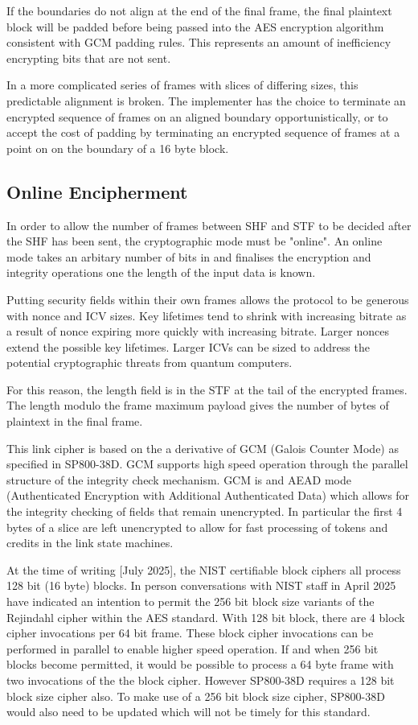 \documentclass[../../../OAE-SPEC-MAIN.tex]{subfiles}
\begin{document}
If the boundaries do not align at the end of the final frame, the final plaintext block will be padded before being passed into the AES encryption algorithm consistent with GCM padding rules. This represents an amount of inefficiency encrypting bits that are not sent.

In a more complicated series of frames with slices of differing sizes, this predictable alignment is broken. The implementer has the choice to terminate an encrypted sequence of frames on an aligned boundary opportunistically, or to accept the cost of padding by terminating an encrypted sequence of frames at a point on on the boundary of a 16 byte block.

\subsection{Online Encipherment}
\label{subsection:online_encipherment}
In order to allow the number of frames between SHF and STF to be decided after the SHF has been sent, the cryptographic mode must be "online". An online mode takes an arbitary number of bits in and finalises the encryption and integrity operations one the length of the input data is known.

Putting security fields within their own frames allows the protocol to be generous with nonce and ICV sizes. Key lifetimes tend to shrink with increasing bitrate as a result of nonce expiring more quickly with increasing bitrate. Larger nonces extend the possible key lifetimes. Larger ICVs can be sized to address the potential cryptographic threats from quantum computers.

For this reason, the length field is in the STF at the tail of the encrypted frames. The length modulo the frame maximum payload gives the number of bytes of plaintext in the final frame. 

This link cipher is based on the a derivative of GCM (Galois Counter Mode) as specified in SP800-38D. GCM supports high speed operation through the parallel structure of the integrity check mechanism. GCM is and AEAD mode (Authenticated Encryption with Additional Authenticated Data) which allows for the integrity checking of fields that remain unencrypted. In particular the first 4 bytes of a slice are left unencrypted to allow for fast processing of tokens and credits in the link state machines. 

At the time of writing [July 2025], the NIST certifiable block ciphers all process 128 bit (16 byte) blocks. In person conversations with NIST staff in April 2025 have indicated an intention to permit the 256 bit block size variants of the Rejindahl cipher within the AES standard. With 128 bit block, there are 4 block cipher invocations per 64 bit frame. These block cipher invocations can be performed in parallel to enable higher speed operation. If and when 256 bit blocks become permitted, it would be possible to process a 64 byte frame with two invocations of the the block cipher. However SP800-38D requires a 128 bit block size cipher also. To make use of a 256 bit block size cipher, SP800-38D would also need to be updated which will not be timely for this standard.
\end{document}
